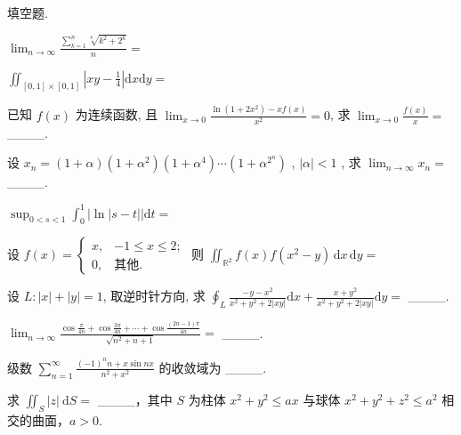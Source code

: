 \par{}
填空题.\par
$\lim_{n\to \infty}\frac{\sum_{k = 1}^{n}\sqrt[k]{k^2 + 2^k}}{n} =$\par
$\iint_{[0,1]\times [0,1]}\left|xy - \frac{1}{4}\right|\mathrm{d}x\mathrm{d}y =$\par
已知 $f(x)$ 为连续函数, 且 $\lim_{x \to 0} \frac{\ln(1 + 2x^2) - xf(x)}{x^2} = 0$, 求 $\lim_{x \to 0} \frac{f(x)}{x} =$ \_\_\_\_.\par
设  $x_{n}=(1+\alpha)(1+\alpha^{2})(1+\alpha^{4})\cdots(1+\alpha^{2^{n}})$ ,  $|\alpha|<1$ , 求  $\lim_{n\to\infty}x_{n}=$  \_\_\_\_.\par
$\sup_{0 < s < 1}\int_0^1 |\ln |s - t||\mathrm{d}t =$\par
设 $f(x) = \begin{cases} x, & -1 \leq x \leq 2; \\ 0, & \text{其他}. \end{cases}$ 则 $\iint_{\mathbb{R}^2} f(x) f(x^2 - y) \, \mathrm{d}x \, \mathrm{d}y =$\par
设 $L: |x| + |y| = 1$, 取逆时针方向, 求 $\oint_{L} \frac{-y - x^{2}}{x^{2} + y^{2} + 2|xy|} \mathrm{d}x + \frac{x + y^{2}}{x^{2} + y^{2} + 2|xy|} \mathrm{d}y =$ \_\_\_\_.\par
$\lim_{n\to\infty}\frac{\cos\frac{\pi}{4n}+\cos\frac{3\pi}{4n}+\cdots+\cos\frac{(2n-1)\pi}{4n}}{\sqrt{n^{2}+n+1}}=$  \_\_\_\_.\par
级数  $\sum_{n=1}^{\infty}\frac{(-1)^{n}n+x\sin nx}{n^{2}+x^{2}}$  的收敛域为 \_\_\_\_.\par
求 $\iint_{S} |z| \mathrm{~d} S =$ \_\_\_\_，其中 $S$ 为柱体 $x^{2} + y^{2} \leq ax$ 与球体 $x^{2} + y^{2} + z^{2} \leq a^{2}$ 相交的曲面，$a > 0$.\par
